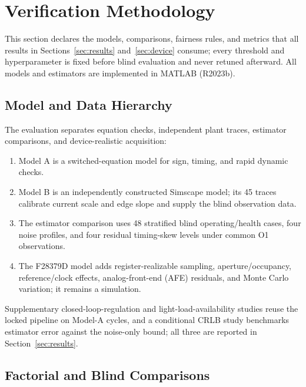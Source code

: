 ﻿\section{Verification Methodology}
\label{sec:protocol}

This section declares the models, comparisons, fairness rules, and metrics that all results in Sections~\ref{sec:results} and~\ref{sec:device} consume; every threshold and hyperparameter is fixed before blind evaluation and never retuned afterward. All models and estimators are implemented in MATLAB (R2023b).

\subsection{Model and Data Hierarchy}

The evaluation separates equation checks, independent plant traces, estimator comparisons, and device-realistic acquisition:
\begin{enumerate}
\item Model A is a switched-equation \Cuk{} model for sign, timing, and rapid dynamic checks.
\item Model B is an independently constructed Simscape model; its 45 traces calibrate current scale and edge slope and supply the blind observation data.
\item The estimator comparison uses 48 stratified blind operating/health cases, four noise profiles, and four residual timing-skew levels under common O1 observations.
\item The F28379D model adds register-realizable sampling, aperture/occupancy, reference/clock effects, analog-front-end (AFE) residuals, and Monte Carlo variation; it remains a simulation.
\end{enumerate}
Supplementary closed-loop-regulation and light-load-availability studies reuse the locked pipeline on Model-A cycles, and a conditional CRLB study benchmarks estimator error against the noise-only bound; all three are reported in Section~\ref{sec:results}.

\subsection{Factorial and Blind Comparisons}

